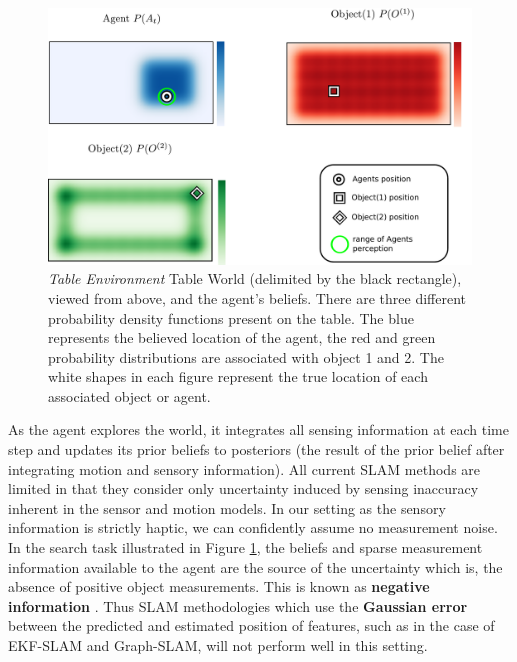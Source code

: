 \begin{figure}
  \centering
  \includegraphics[width=0.95\linewidth]{./ch5-MLMF/Figures/Figure1_v2.pdf}
  \caption{ \textit{Table Environment} Table World (delimited by the black rectangle), viewed from above, and the agent's beliefs. 
  There are three different probability density functions present on the table. 
  The blue represents the believed location of the agent, the red and green probability distributions are associated with object 1 and 2.
  The white shapes in each figure represent the true location of each associated object or agent.}
  \label{fig:Figure1}
\end{figure}
\vspace*{0.6cm}

As the agent explores the world, it integrates all sensing information at each time step and updates its prior beliefs to posteriors
(the result of the prior belief after integrating motion and sensory information).
All current SLAM methods are limited in that they consider only uncertainty induced by sensing inaccuracy inherent in 
the sensor and motion models. In our setting as the sensory information is strictly haptic, we can confidently assume no measurement noise. 
In the search task illustrated in Figure \ref{fig:Figure1}, the beliefs and sparse measurement information available to the agent are 
the source of the uncertainty which is, the absence of positive object measurements. 
This is known as \textbf{negative information} \cite[p.313]{Thrun_Burgard_Fox_2005} \cite{Thrun02particlefilters,negative_info_markov_localisation}. 
Thus SLAM methodologies which use the \textbf{Gaussian error} between the predicted and estimated position of features, such as in the case 
of EKF-SLAM and Graph-SLAM, will not perform well in this setting. 

